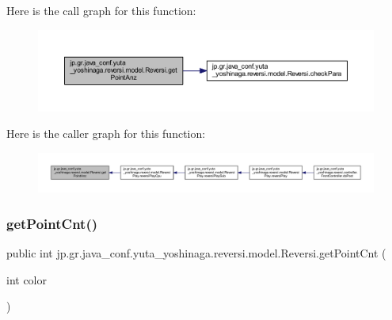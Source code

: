Here is the call graph for this function\+:
\nopagebreak
\begin{figure}[H]
\begin{center}
\leavevmode
\includegraphics[width=350pt]{classjp_1_1gr_1_1java__conf_1_1yuta__yoshinaga_1_1reversi_1_1model_1_1_reversi_a6da3f67c0468cf59ba6ceb796133c921_cgraph}
\end{center}
\end{figure}
Here is the caller graph for this function\+:
\nopagebreak
\begin{figure}[H]
\begin{center}
\leavevmode
\includegraphics[width=350pt]{classjp_1_1gr_1_1java__conf_1_1yuta__yoshinaga_1_1reversi_1_1model_1_1_reversi_a6da3f67c0468cf59ba6ceb796133c921_icgraph}
\end{center}
\end{figure}
\mbox{\label{classjp_1_1gr_1_1java__conf_1_1yuta__yoshinaga_1_1reversi_1_1model_1_1_reversi_a8ab289d67a725a30e92411c90b755bd8}} 
\subsubsection{\texorpdfstring{get\+Point\+Cnt()}{getPointCnt()}}
{\footnotesize\ttfamily public int jp.\+gr.\+java\+\_\+conf.\+yuta\+\_\+yoshinaga.\+reversi.\+model.\+Reversi.\+get\+Point\+Cnt (\begin{DoxyParamCaption}\item[{int}]{color }\end{DoxyParamCaption})}



